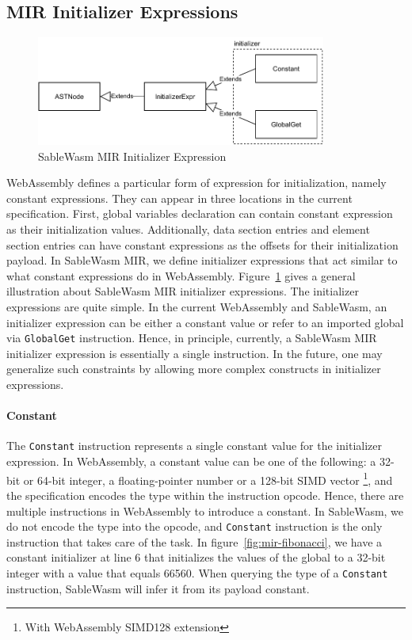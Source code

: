 \subsection{MIR Initializer Expressions}

\begin{figure}
  \centering
  \includegraphics[width=0.85\textwidth]{Images/4.MIR/initalizer-expression.pdf}
  \caption{SableWasm MIR Initializer Expression}
  \label{fig:sablewasm-mir-initializer-expression}
\end{figure}

WebAssembly defines a particular form of expression for initialization, namely
constant expressions. They can appear in three locations in the current
specification. First, global variables declaration can contain constant
expression as their initialization values. Additionally, data section entries
and element section entries can have constant expressions as the offsets for
their initialization payload. In SableWasm MIR, we define initializer
expressions that act similar to what constant expressions do in WebAssembly.
Figure~\ref{fig:sablewasm-mir-initializer-expression} gives a general
illustration about SableWasm MIR initializer expressions. The initializer
expressions are quite simple. In the current WebAssembly and SableWasm, an
initializer expression can be either a constant value or refer to an imported
global via \texttt{GlobalGet} instruction. Hence, in principle, currently,
a SableWasm MIR initializer expression is essentially a single instruction. In
the future, one may generalize such constraints by allowing more complex
constructs in initializer expressions.

\paragraph{Constant}
The \texttt{Constant} instruction represents a single constant value for the
initializer expression. In WebAssembly, a constant value can be one of the
following: a 32-bit or 64-bit integer, a floating-pointer number or a 128-bit
SIMD vector \footnote{With WebAssembly SIMD128 extension}, and the specification
encodes the type within the instruction opcode. Hence, there are multiple
instructions in WebAssembly to introduce a constant. In SableWasm, we do not
encode the type into the opcode, and \texttt{Constant} instruction is the only
instruction that takes care of the task. In figure~\ref{fig:mir-fibonacci}, we
have a constant initializer at line 6 that initializes the values of the global
to a 32-bit integer with a value that equals 66560. When querying the type of a
\texttt{Constant} instruction, SableWasm will infer it from its payload
constant.

